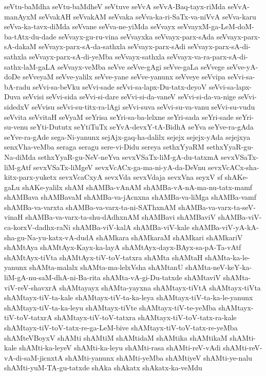 {seVtu-baMdha
seVtu-baMdheV
seVtuve
seVvA
seVvA-Baq-tayx-riMda
seVvA-manAyxM
seVvakAH
seVvakAM
seVvaka
seVva-ka-ri-SaTx-va-niVvA
seVva-karu
seVva-ka-tavx-diMda
seVvane
seVva-ne-yiMda
seVvayx
seVvayxM-ga-LeM-doM-ba-tAtx-du-dade
seVvayx-gu-ru-vina
seVvayxka
seVvayx-parx-sAda
seVvayx-parx-sA-dakaM
seVvayx-parx-sA-da-sathxla
seVvayx-parx-sAdi
seVvayx-parx-sA-di-sathxla
seVvayx-parx-sA-di-yeMba
seVvayx-sathxla
seVvayx-va-ra-parx-sA-di-sathx-laM-gaLA
seVvayx-veMba
seVve
seVve-gAgi
seVve-gaLa
seVvege
seVve-yA-doDe
seVveyaM
seVve-yalilx
seVve-yane
seVve-yanunx
seVveye
seVvipa
seVvi-sa-bA-radu
seVvi-sa-beVku
seVvi-sade
seVvi-sa-lapx-Du-tatx-deyoV
seVvi-sa-lapx-Duva
seVvisi
seVvi-sida
seVvi-si-dare
seVvi-si-da-vaneV
seVvi-si-da-va-nige
seVvi-sidedxV
seVvisu
seVvi-su-titx-ra-lAgi
seVvi-suva
seVvi-su-va-vanu
seVvi-su-vudu
seVvita
seVvitaH
seVyaM
seYrisa
seYri-sa-ba-lelxne
seYri-sada
seYri-sade
seYri-su-venu
seYti-Dututx
seYtiTuTx
seYvA-devxY-tA-BidhA
seYva
seYve-ra-gAda
seYve-ra-gAde
sega-Ni-yanunx
sejAjx-gaq-ha-dalilx
sejejx
sejejx-yAda
sejejxya
senxVha-veMba
seraga
seragu
sere-vi-Didu
sereya
sethxYyaRM
sethxYyaR-gu-Na-diMda
sethxYyaR-gu-NeV-neYva
sevxVSaTx-liM-gA-du-tatxmA
sevxVSaTx-liM-gAtf
sevxVSaTx-liMgeV
sevxVcACx-ga-ma-ni-yA-da-DeVnu
sevxVcACx-sha-kitx-parx-yuketx
sevxVcaCxyA
sevxVda
sevxVdaja
sevxVna
seyxV
sf
shAKe-gaLu
shAKe-yalilx
shAM
shAMBa-vAnAM
shAMBa-vA-nA-ma-nu-tatx-mamf
shAMBava
shAMBavaM
shAMBa-va-jAcnxna
shAMBa-va-liMga
shAMBa-vamf
shAMBa-va-varxta
shAMBa-va-varx-ta-ni-SAThxnAM
shAMBa-va-varx-ta-seV-vinaH
shAMBa-va-varx-ta-shu-dAdhxnAM
shAMBavi
shAMBaviV
shAMBa-viV-ca-korxV-dadhx-raNi
shAMBa-viV-kalA
shAMBa-viV-kale
shAMBa-viV-yA-kA-sha-gu-Na-yu-katx-vA-dudA
shAMkara
shAMkaraM
shAMkari
shAMkariV
shAMtAya
shAMtAyx-Kayx-ka-layA
shAMtAyx-dayx-BAyx-sa-pA-Ta-vAtf
shAMtAyx-tiVta
shAMtAyx-tiV-toV-tatxra
shAMta
shAMtaH
shAMta-ka-le-yanunx
shAMta-malalx
shAMta-ma-lelxVsha
shAMtanU
shAMta-neV-keY-ka-liM-gA-nu-saM-dhA-ni-Ba-rita
shAMta-vA-gi-Du-tatxde
shAMtaviV
shAMta-viV-reV-shavxrA
shAMtayayx
shAMta-yayxna
shAMtayx-tiVtA
shAMtayx-tiVta
shAMtayx-tiV-ta-kale
shAMtayx-tiV-ta-ka-leya
shAMtayx-tiV-ta-ka-le-yanunx
shAMtayx-tiV-ta-ka-leyu
shAMtayx-tiVte
shAMtayx-tiV-te-yeMba
shAMtayx-tiV-toV-tatxrA
shAMtayx-tiV-toV-tatxra
shAMtayx-tiV-toV-tatx-ra-kale
shAMtayx-tiV-toV-tatx-re-ga-LeM-bive
shAMtayx-tiV-toV-tatx-re-yeMba
shAMteVBoyxV
shAMti
shAMtiM
shAMtidaM
shAMtika
shAMtikaM
shAMti-kale
shAMti-ka-leyeV
shAMti-ka-leyu
shAMti-rasa
shAMti-reV-vAdi
shAMti-reV-vA-di-saM-jicnxtA
shAMti-yanunx
shAMti-yeMba
shAMtiyeV
shAMti-ye-nalu
shAMti-yuM-TA-gu-tatxde
shAka
shAkatx
shAkatx-ka-veMdu
}
